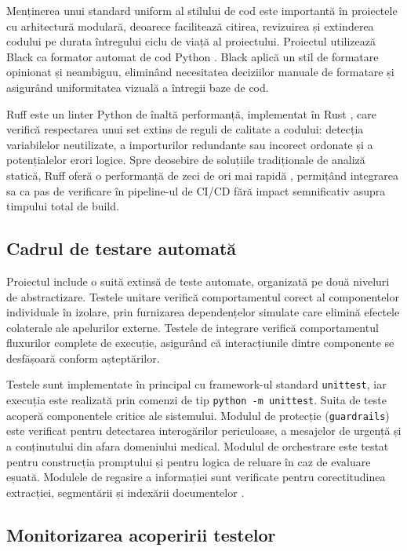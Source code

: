 \documentclass[12pt, a4paper, oneside, romanian]{teza-upb}
\begin{document}
Menținerea unui standard uniform al stilului de cod este importantă în proiectele cu arhitectură modulară, deoarece facilitează citirea, revizuirea și extinderea codului pe durata întregului ciclu de viață al proiectului. Proiectul utilizează Black ca formator automat de cod Python \cite{black_doc}. Black aplică un stil de formatare opinionat și neambiguu, eliminând necesitatea deciziilor manuale de formatare și asigurând uniformitatea vizuală a întregii baze de cod.

Ruff este un linter Python de înaltă performanță, implementat în Rust \cite{ruff_doc}, care verifică respectarea unui set extins de reguli de calitate a codului: detecția variabilelor neutilizate, a importurilor redundante sau incorect ordonate și a potențialelor erori logice. Spre deosebire de soluțiile tradiționale de analiză statică, Ruff oferă o performanță de zeci de ori mai rapidă \cite{ruff_doc}, permițând integrarea sa ca pas de verificare în pipeline-ul de CI/CD fără impact semnificativ asupra timpului total de build.

\subsection{Cadrul de testare automată}

Proiectul include o suită extinsă de teste automate, organizată pe două niveluri de abstractizare. Testele unitare verifică comportamentul corect al componentelor individuale în izolare, prin furnizarea dependențelor simulate care elimină efectele colaterale ale apelurilor externe. Testele de integrare verifică comportamentul fluxurilor complete de execuție, asigurând că interacțiunile dintre componente se desfășoară conform așteptărilor.

Testele sunt implementate în principal cu framework-ul standard \texttt{unittest}, iar execuția este realizată prin comenzi de tip \texttt{python -m unittest}. Suita de teste acoperă componentele critice ale sistemului. Modulul de protecție (\texttt{guardrails}) este verificat pentru detectarea interogărilor periculoase, a mesajelor de urgență și a conținutului din afara domeniului medical. Modulul de orchestrare este testat pentru construcția promptului și pentru logica de reluare în caz de evaluare eșuată. Modulele de regasire a informației sunt verificate pentru corectitudinea extracției, segmentării și indexării documentelor \cite{python_unittest}.

\subsection{Monitorizarea acoperirii testelor}
\end{document}
